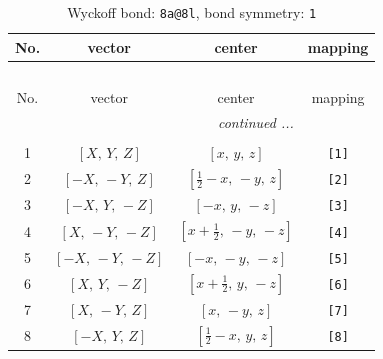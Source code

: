 \documentclass[fleqn,8pt]{jsarticle}
\begin{document}
\begin{longtable}{cccc}
\caption{Wyckoff bond: {\tt 8a@8l}, bond symmetry: {\tt 1}}
 \\
 \hline \hline
No. & vector & center & mapping \\ \hline \endfirsthead

\multicolumn{3}{l}{\tablename\ \thetable{}} \\
 \hline \hline
No. & vector & center & mapping \\ \hline \endhead

 \hline \hline
\multicolumn{3}{r}{\footnotesize\it continued ...} \\ \endfoot

 \hline \hline
\multicolumn{3}{r}{} \\ \endlastfoot

1 & $\left[ X,\, Y,\, Z \right]$ & $\left[ x,\, y,\, z \right]$ & {\tt [1]} \\ \hline
2 & $\left[ - X,\, - Y,\, Z \right]$ & $\left[ \frac{1}{2} - x,\, - y,\, z \right]$ & {\tt [2]} \\ \hline
3 & $\left[ - X,\, Y,\, - Z \right]$ & $\left[ - x,\, y,\, - z \right]$ & {\tt [3]} \\ \hline
4 & $\left[ X,\, - Y,\, - Z \right]$ & $\left[ x + \frac{1}{2},\, - y,\, - z \right]$ & {\tt [4]} \\ \hline
5 & $\left[ - X,\, - Y,\, - Z \right]$ & $\left[ - x,\, - y,\, - z \right]$ & {\tt [5]} \\ \hline
6 & $\left[ X,\, Y,\, - Z \right]$ & $\left[ x + \frac{1}{2},\, y,\, - z \right]$ & {\tt [6]} \\ \hline
7 & $\left[ X,\, - Y,\, Z \right]$ & $\left[ x,\, - y,\, z \right]$ & {\tt [7]} \\ \hline
8 & $\left[ - X,\, Y,\, Z \right]$ & $\left[ \frac{1}{2} - x,\, y,\, z \right]$ & {\tt [8]} \\
\end{longtable}
\end{document}
